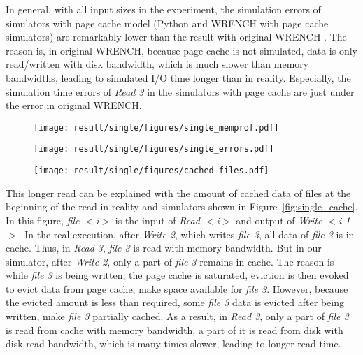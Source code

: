 \documentclass[conference]{IEEEtran}
\begin{document}
			In general, with all input sizes in the experiment, the simulation errors 
			of simulators with page cache model (Python and WRENCH with page cache simulators) 
			are remarkably lower than the result with original WRENCH . 
			The reason is, in original WRENCH, because page cache is not simulated, 
			data is only read/written with disk bandwidth, which is much slower 
			than memory bandwidths, leading to simulated I/O time longer than in reality.
			Especially, the simulation time errors of \textit{Read 3} in the simulators 
			with page cache are just under the error in original WRENCH. 
		
			\begin{figure*}
			\centering
			\begin{subfigure}{\linewidth}
				\centering
   				\texttt{[image: result/single/figures/single\_memprof.pdf]}
			\end{subfigure}
			\caption{Memory profiling results with different input file sizes}
			\label{fig:single_memprof}	
			\begin{subfigure}{\linewidth}
				\centering
   				\texttt{[image: result/single/figures/single\_errors.pdf]}
			\end{subfigure}
			\caption{Simulation errors with different input file sizes}
			\label{fig:single_error}	
			\begin{subfigure}{\linewidth}
				\centering
   				\texttt{[image: result/single/figures/cached\_files.pdf]}
			\end{subfigure}	
			\label{fig:single_cache}
   			\caption{Amount of file data in cache after each I/O activity with 100GB of input}
			\end{figure*}			

			This longer read can be explained with the amount of cached data of files 
			at the beginning of the read in reality and simulators shown in 
			Figure~\ref{fig:single_cache}. 			
			In this figure, \textit{file $<$i$>$} is the input of \textit{Read $<$i$>$} and 
			output of \textit{Write $<$i-1$>$}. 
			In the real execution, after \textit{Write 2}, which writes \textit{file 3}, 
			all data of \textit{file 3} is in cache. 
			Thus, in \textit{Read 3}, \textit{file 3} is read with memory bandwidth. 
			But in our simulator, after \textit{Write 2}, only a part of \textit{file 3} 
			remains in cache. 
			The reason is while \textit{file 3}  is being written, the page cache is saturated, 
			eviction is then evoked to evict data from page cache, make space 
			available for \textit{file 3}. 
			However, because the evicted amount is less than required, 
			some \textit{file 3} data is evicted after being written, make \textit{file 3} 
			partially cached. 
			As a result, in \textit{Read 3}, only a part of \textit{file 3} is read from cache 
			with memory bandwidth, a part of it is read from disk with disk read bandwidth, 
			which is many times slower, leading to longer read time. 			
			
\end{document}
